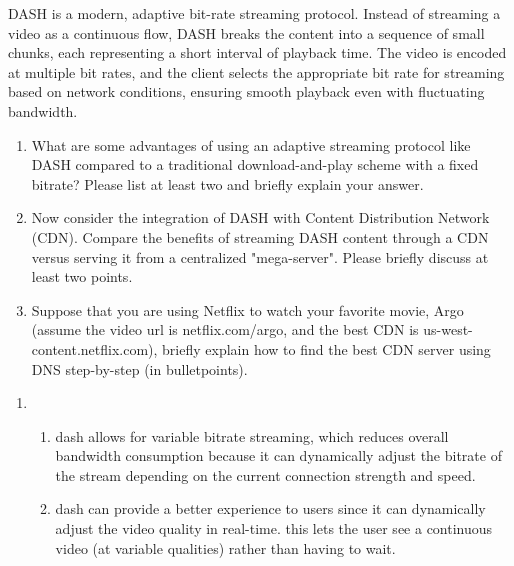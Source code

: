 \documentclass{report}
\begin{document}
\begin{problem}
DASH is a modern, adaptive bit-rate streaming protocol. Instead of streaming a video as a continuous flow, DASH breaks the content into a sequence of small chunks, each representing a short interval of playback time. The video is encoded at multiple bit rates, and the client selects the appropriate bit rate for streaming based on network conditions, ensuring smooth playback even with fluctuating bandwidth.
\begin{enumerate}
\item What are some advantages of using an adaptive streaming protocol like DASH compared to a traditional download-and-play scheme with a fixed bitrate? Please list at least two and briefly explain your answer. 
\item Now consider the integration of DASH with Content Distribution Network (CDN). Compare the benefits of streaming DASH content through a CDN versus serving it from a centralized "mega-server". Please briefly discuss at least two points.
\item Suppose that you are using Netflix to watch your favorite movie, Argo (assume the video url is netflix.com/argo, and the best CDN is us-west-content.netflix.com), briefly explain how to find the best CDN server using DNS step-by-step (in bulletpoints).

\end{enumerate}

\begin{answer}{40em}
  \begin{enumerate}[label=(\alph*)]
  \item
    \begin{enumerate}[label=\textit{(\roman*)}]
    \item dash allows for variable bitrate streaming, which reduces overall bandwidth consumption
      because it can dynamically adjust the bitrate of the stream depending on the current
      connection strength and speed.
    \item dash can provide a better experience to users since it can dynamically adjust the video
      quality in real-time. this lets the user see a continuous video (at variable qualities) rather than
      having to wait.
    \end{enumerate}


\end{enumerate}
\end{answer}
\end{problem}
\end{document}
